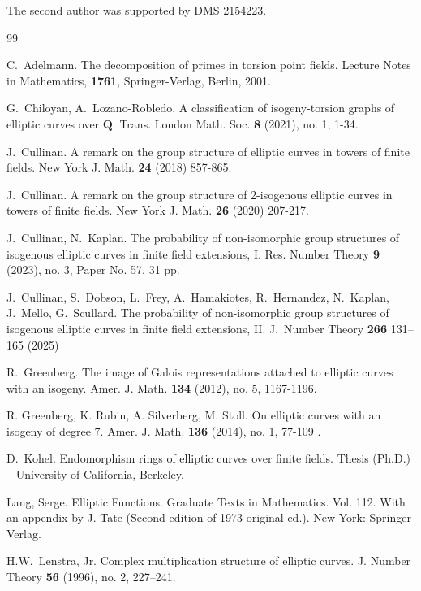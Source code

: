 \documentclass{amsart}
\newcommand{\Q}{\mathbf{Q}}
\numberwithin{equation}{section}
\theoremstyle{plain}
\theoremstyle{remark}
\begin{document}
The second author was supported by DMS 2154223.

\begin{thebibliography}{99}

 C.~Adelmann. The decomposition of primes in torsion point fields. Lecture Notes in Mathematics, \textbf{1761}, Springer-Verlag, Berlin, 2001.

 G.~Chiloyan, A.~Lozano-Robledo.  A classification of isogeny-torsion graphs of elliptic curves over $\Q$. Trans. London Math. Soc. \textbf{8} (2021), no. 1, 1-34.

 {J.~Cullinan.} 
A remark on the group structure of elliptic curves in towers of finite fields.
New York J. Math. {\bf 24} (2018) 857-865.

 {J.~Cullinan.}  A remark on the group structure of 2-isogenous elliptic curves in towers of finite fields. {New York J. Math.} \textbf{26}  (2020) 207-217. 

 {J.~Cullinan, N.~Kaplan.} The probability of non-isomorphic group structures of isogenous elliptic
curves in finite field extensions, I. Res. Number Theory \textbf{9} (2023), no. 3, Paper No. 57, 31 pp.

 J.~Cullinan, S.~Dobson, L.~Frey, A.~Hamakiotes, R.~Hernandez, N.~Kaplan, J.~Mello, G.~Scullard. The probability of non-isomorphic group structures of isogenous elliptic curves in finite field extensions, II. J.~Number Theory \textbf{266} 131--165 (2025)

 R.~Greenberg. The image of Galois representations attached to elliptic curves with an isogeny. Amer. J. Math. \textbf{134} (2012), no. 5, 1167-1196.

 R. Greenberg, K. Rubin, A. Silverberg, M. Stoll. On elliptic curves with an isogeny of degree 7.  Amer. J. Math. \textbf{136}  (2014), no. 1,  77-109 .

 D.~Kohel. Endomorphism rings of elliptic curves over finite fields. Thesis (Ph.D.) -- University of California, Berkeley.

 {Lang, Serge.} Elliptic Functions. Graduate Texts in Mathematics. Vol. 112. With an appendix by J. Tate (Second edition of 1973 original ed.). New York: Springer-Verlag.

H.W.~Lenstra, Jr. Complex multiplication structure of elliptic curves.
{J. Number Theory} {\bf 56} (1996), no. 2, 227--241. 


\end{thebibliography}
\end{document}
